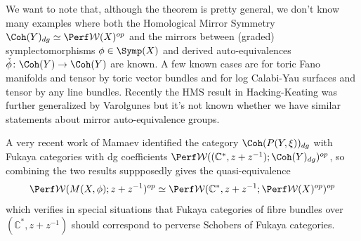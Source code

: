 We want to note that, although the theorem is pretty general, we don't know many examples where both the Homological Mirror Symmetry $\Coh (Y)_{dg}\simeq\Perf\mathcal{W} (X)^{op}$ and the mirrors between (graded) symplectomorphisms $\phi\in\Symp (X)$ and derived auto-equivalences $\check{\phi}\colon\Coh (Y)\to\Coh (Y)$ are known. A few known cases are for toric Fano manifolds \cite{FLTZ12,Abouzaid09,Hanlon19,GPS24M} and tensor by toric vector bundles and for log Calabi-Yau surfaces \cite{HK22,HK25} and tensor by any line bundles. Recently the HMS result in Hacking-Keating was further generalized by Varolgunes \cite{Varolgunes26} but it's not known whether we have similar statements about mirror auto-equivalence groups.\par
A very recent work of Mamaev \cite{Mamaev26} identified the category $\Coh (P(Y,\xi))_{dg}$ with Fukaya categories with dg coefficients $\Perf\mathcal{W} ((\mathbb{C}^{\ast},z+z^{-1});\Coh (Y)_{dg})^{op}$, so combining the two results suppposedly gives the quasi-equivalence \[
    \Perf\mathcal{W} (M(X,\phi);z+z^{-1})^{op}\simeq\Perf\mathcal{W} (\mathbb{C}^{\ast},z+z^{-1};\Perf\mathcal{W} (X)^{op})^{op}
\]which verifies in special situations that Fukaya categories of fibre bundles over $(\mathbb{C}^{\ast}, z+z^{-1})$ should correspond to perverse Schobers of Fukaya categories.
